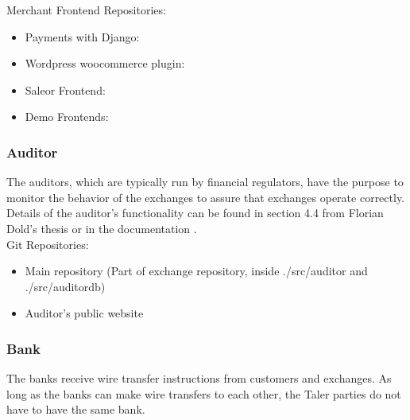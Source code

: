 \noindent Merchant Frontend Repositories:
\begin{itemize}
    \item Payments with Django: \cite{taler-git:django-payments}
    \item Wordpress woocommerce plugin: \cite{taler-git:woocommerce}
    \item Saleor Frontend: \cite{taler-git:saleor}
    \item Demo Frontends: \cite{taler-git:merchant-demos}
\end{itemize}

\subsubsection{Auditor}
The auditors, which are typically run by financial regulators, have the purpose to monitor the behavior of the exchanges to assure that exchanges operate correctly.
\\
Details of the auditor's functionality can be found in section 4.4 from Florian Dold's thesis \cite{dold:the-gnu-taler-system} or in the documentation \cite{taler-documentation:auditor-operator-manual}.
\\Git Repositories:
\begin{itemize}
    \item Main repository \cite{taler-git:exchange} (Part of exchange repository, inside ./src/auditor and ./src/auditordb)
    \item Auditor's public website \cite{taler-git:auditor}
\end{itemize}

\subsubsection{Bank}
The banks receive wire transfer instructions from customers and exchanges.
As long as the banks can make wire transfers to each other, the Taler parties do not have to have the same bank.

